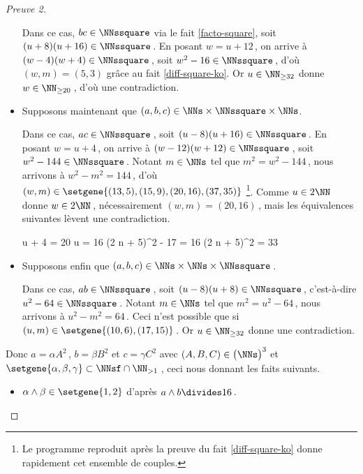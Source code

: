 \begin{proof}[Preuve 2]
\begin{itemize}
		\smallskip
		\noindent
		Dans ce cas, $bc \in \NNssquare$ via le fait \ref{facto-square}, soit $(u + 8) (u + 16) \in \NNssquare$\,.
		En posant $w = u + 12$\,, on arrive à $(w - 4) (w + 4) \in \NNssquare$\,, soit $w^2 - 16 \in \NNssquare$\,, d'où $(w, m) = (5, 3)$ grâce au fait \ref{diff-square-ko}.
		Or $u \in \NN_{\geq 32}$ donne $w \in \NN_{\geq 20}$\,, d'où une contradiction.

		
		\medskip
		\item Supposons maintenant que $(a, b, c) \in \NNs \times \NNssquare \times \NNs$. 
		
		\smallskip
		\noindent
		Dans ce cas, $ac \in \NNssquare$\,, soit $(u - 8) (u + 16) \in \NNssquare$\,.
		En posant $w = u + 4$\,, on arrive à $(w - 12) (w + 12) \in \NNssquare$\,, soit $w^2 - 144 \in \NNssquare$\,.
		Notant $m \in \NNs$ tel que $m^2 = w^2 - 144$\,, nous arrivons à $w^2 - m^2 = 144$\,, d'où $(w, m) \in \setgene{(13, 5) , (15, 9) , (20, 16) , (37, 35)}$
		\footnote{
			Le programme reproduit après la preuve du fait \ref{diff-square-ko} donne rapidement cet ensemble de couples.
		}.
		Comme $u \in 2 \NN$ donne $w \in 2 \NN$\,, nécessairement $(w, m) = (20, 16)$\,, mais les équivalences suivantes lèvent une contradiction.

		\noindent\!\!%
   		\begin{stepcalc}[style = sar, ope = \iff]
			u + 4 = 20
		\explnext{}
			u = 16
		\explnext{}
			(2 n + 5)^2 - 17 = 16
		\explnext*{$33 \notin \NNsquare$}{}
			(2 n + 5)^2 = 33
		\end{stepcalc}	
		
		
		\medskip
		\item Supposons enfin que $(a, b, c) \in \NNs \times \NNs \times \NNssquare$\,. 
		
		\smallskip
		\noindent
		Dans ce cas, $ab \in \NNssquare$\,, soit $(u - 8) (u + 8) \in \NNssquare$\,, c'est-à-dire $u^2 - 64 \in \NNssquare$\,.
		Notant $m \in \NNs$ tel que $m^2 = u^2 - 64$\,, nous arrivons à $u^2 - m^2 = 64$\,.
		Ceci n'est possible que si $(u, m) \in \setgene{(10, 6), (17, 15)}$\,.
		Or $u \in \NN_{\geq 32}$ donne une contradiction.
	\end{itemize}

	\medskip

	Donc 
	$a = \alpha A^2$\,, $b = \beta B^2$ et $c = \gamma C^2$ 
	avec $(A, B, C) \in \big( \NNs \big)^3$
	et
	$\setgene{\alpha, \beta, \gamma} \subset \NNsf \cap \NN_{>1}$\,,
	ceci nous donnant les faits suivants.
    
    \begin{itemize}
		\item $\alpha \wedge \beta \in \setgene{1, 2}$
		d'après $a \wedge b \divides 16$\,.


\end{itemize}
\end{proof}
